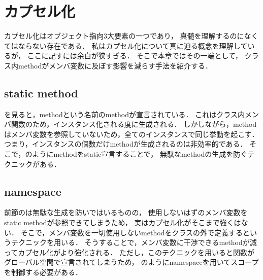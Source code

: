 \section{カプセル化}
カプセル化はオブジェクト指向3大要素の一つであり，
真髄を理解するのになくてはならない存在である．
私はカプセル化について真に迫る概念を理解しているが，
ここに記すには余白が狭すぎる．
そこで本章ではその一端として，
クラス内methodがメンバ変数に及ぼす影響を減らす手法を紹介する．


\subsection{static method}
を見ると，methodという名前のmethodが宣言されている．
これはクラス内メンバ関数のため，インスタンス化される度に生成される．
しかしながら，methodはメンバ変数を参照していないため，全てのインスタンスで同じ挙動を起こす．
つまり，インスタンスの個数だけmethodが生成されるのは非効率的である．
そこで，のようにmethodをstatic宣言することで，
無駄なmethodの生成を防ぐテクニックがある．




\subsection{namespace}
前節のは無駄な生成を防いではいるものの，
使用しないはずのメンバ変数をstatic methodが参照できてしまうため，
実はカプセル化がそこまで強くはない．
そこで，メンバ変数を一切使用しないmethodをクラスの外で定義するというテクニックを用いる．
そうすることで，メンバ変数に干渉できるmethodが減ってカプセル化がより強化される．
ただし，このテクニックを用いると関数がグローバル空間で宣言されてしまうため，
のようにnamespaceを用いてスコープを制御する必要がある．



